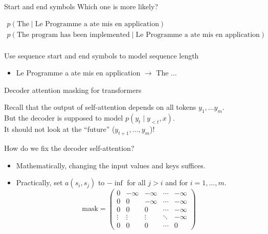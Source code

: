 \documentclass[usenames,dvipsnames,notes,11pt,aspectratio=169,hyperref={colorlinks=true, linkcolor=blue}]{beamer}
\begin{document}
\begin{frame}
    {Start and end symbols}
    Which one is more likely?

    \begin{align*}
    p(\text{The} \mid \text{Le Programme    a    ate    mis    en application}) \\
    p(\text{The program has been implemented} \mid \text{Le Programme    a    ate    mis    en application}) \\
    \end{align*}

    \pause
    Use sequence start and end symbols to model sequence length
    \begin{itemize}
        \item {Le Programme    a    ate    mis    en application}
            $\to$  The ... 
    \end{itemize}
\end{frame}


\begin{frame}
    {Decoder attention masking for transformers}

    Recall that the output of self-attention depends on all tokens $y_1,\ldots y_m$.\\
    But the decoder is supposed to model $p(y_t\mid y_{<t}, x)$.\\
    It should not look at the ``future'' ($y_{t+1},\ldots,y_m$)!

    \pause
    How do we fix the decoder self-attention?\\
    \begin{itemize}
        \item Mathematically, changing the input values and keys suffices.
        \item Practically, set $a(s_i, s_j)$ to $-\inf$ for all $j>i$ and for $i=1,\ldots,m$.
            \[
                \mathrm{mask} = 
\begin{pmatrix}
0 & -\infty & -\infty & \cdots & -\infty \\
0 & 0       & -\infty & \cdots & -\infty \\
0 & 0       & 0       & \cdots & -\infty \\
\vdots & \vdots & \vdots & \ddots & -\infty \\
0 & 0 & 0 & \cdots & 0
\end{pmatrix}
\]

    \end{itemize}
\end{frame}
\end{document}
